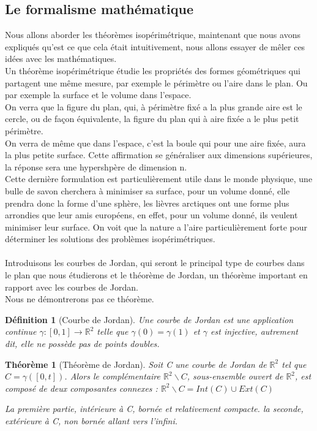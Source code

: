 \documentclass{book}
\newtheorem{theorem}{Théorème}
\newtheorem{definition}{Définition}
\begin{document}
\subsection{Le formalisme mathématique}

{\noindent Nous allons aborder les théorèmes isopérimétrique, maintenant que nous avons expliqués qu'est ce que cela était intuitivement, nous allons essayer de mêler ces idées avec les mathématiques.}\\
Un théorème isopérimétrique étudie les propriétés des formes géométriques qui partagent une même mesure, par exemple le périmètre ou l'aire dans le plan. Ou par exemple la surface et le volume dans l'espace.\\
On verra que la figure du plan, qui, à périmètre fixé a la plus grande aire est le cercle, ou de façon équivalente, la figure du plan qui à aire fixée a le plus petit périmètre.\\
On verra de même que dans l'espace, c'est la boule qui pour une aire fixée, aura la plus petite surface. Cette affirmation se généraliser aux dimensions supérieures, la réponse sera une hypershpère de dimension n.\\
Cette dernière formulation est particulièrement utile dans le monde physique, une bulle de savon cherchera à minimiser sa surface, pour un volume donné, elle prendra donc la forme d'une sphère, les lièvres arctiques ont une forme plus arrondies que leur amis européens, en effet, pour un volume donné, ils veulent minimiser leur surface. On voit que la nature a l'aire particulièrement forte pour déterminer les solutions des problèmes isopérimétriques.\\\\
Introduisons les courbes de Jordan, qui seront le principal type de courbes dans le plan que nous étudierons et le théorème de Jordan, un théorème important en rapport avec les courbes de Jordan.\\
Nous ne démontrerons pas ce théorème.

\begin{definition}[Courbe de Jordan]
Une courbe de Jordan est une application continue $\gamma : [0,1] \rightarrow \mathbb{R}^2$ telle que $\gamma(0) = \gamma(1)$ et $\gamma$ est injective, autrement dit, elle ne possède pas de points doubles.

\end{definition}

\begin{tcolorbox}[colback=green!6]
\begin{theorem}[Théorème de Jordan]
Soit C une courbe de Jordan de $\mathbb{R}^2$ tel que $C = \gamma([0, t])$.
Alors le complémentaire $\mathbb{R}^2 \backslash C$, sous-ensemble ouvert de $\mathbb{R}^2$, est composé de deux composantes connexes : $\mathbb{R}^2 \backslash C = Int(C) \cup Ext(C)$

La première partie, intérieure à C, bornée et relativement compacte.
la seconde, extérieure à C, non bornée allant vers l'infini.
\end{theorem}
\end{tcolorbox}
\end{document}
